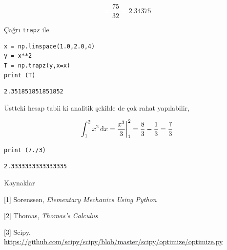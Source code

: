 \documentclass[12pt,fleqn]{article}\usepackage{../../common}
\begin{document}
$$
= \frac{75}{32} = 2.34375
$$

Çağrı \verb!trapz! ile

\begin{verbatim}
x = np.linspace(1.0,2.0,4)
y = x**2
T = np.trapz(y,x=x)
print (T)
\end{verbatim}

\begin{verbatim}
2.351851851851852
\end{verbatim}

Üstteki hesap tabii ki analitik şekilde de çok rahat yapılabilir, 

$$
\int_{1}^{2} x^2 \,\mathrm{d} x = \frac{x^3}{3} \biggr|_{1}^{2} = 
\frac{8}{3}-\frac{1}{3} = 
\frac{7}{3}
$$

\begin{verbatim}
print (7./3)
\end{verbatim}

\begin{verbatim}
2.3333333333333335
\end{verbatim}





Kaynaklar

[1] Sorenssen, {\em Elementary Mechanics Using Python}

[2] Thomas, {\em Thomas's Calculus}

[3] Scipy,
    \url{https://github.com/scipy/scipy/blob/master/scipy/optimize/optimize.py}
\end{document}
